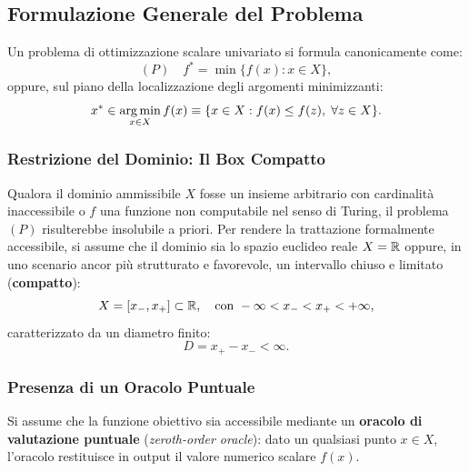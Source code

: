 \subsection{Formulazione Generale del Problema}
Un problema di ottimizzazione scalare univariato si formula canonicamente come:
\begin{equation}
    (P) \quad f^* = \min \{ f(x) : x \in X \},
\end{equation}
oppure, sul piano della localizzazione degli argomenti minimizzanti:
\begin{equation}
    x^* \in \operatorname*{arg\,min}_{x \in X} f(x) \equiv \{ x \in X : f(x) \le f(z), \; \forall z \in X \}.
\end{equation}

\subsubsection{Restrizione del Dominio: Il Box Compatto}
Qualora il dominio ammissibile $X$ fosse un insieme arbitrario con cardinalit\`a inaccessibile o $f$ una funzione non computabile nel senso di Turing, il problema $(P)$ risulterebbe insolubile a priori. Per rendere la trattazione formalmente accessibile, si assume che il dominio sia lo spazio euclideo reale $X = \mathbb{R}$ oppure, in uno scenario ancor pi\`u strutturato e favorevole, un intervallo chiuso e limitato (\textbf{compatto}):
\begin{equation}
    X = [x_-, x_+] \subset \mathbb{R}, \quad \text{con } -\infty < x_- < x_+ < +\infty,
\end{equation}
caratterizzato da un diametro finito:
\begin{equation}
    D = x_+ - x_- < \infty.
\end{equation}

\subsubsection{Presenza di un Oracolo Puntuale}
Si assume che la funzione obiettivo sia accessibile mediante un \textbf{oracolo di valutazione puntuale} (\textit{zeroth-order oracle}): dato un qualsiasi punto $x \in X$, l'oracolo restituisce in output il valore numerico scalare $f(x)$.

